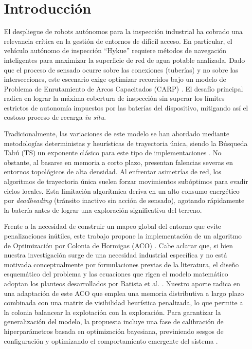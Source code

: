 \documentclass[conference]{IEEEtran}
\begin{document}
\section{Introducción}
El despliegue de robots autónomos para la inspección industrial ha cobrado una relevancia crítica en la gestión de entornos de difícil acceso. En particular, el vehículo autónomo de inspección ``Hykue'' requiere métodos de navegación inteligentes para maximizar la superficie de red de agua potable analizada. Dado que el proceso de sensado ocurre sobre las conexiones (tuberías) y no sobre las intersecciones, este escenario exige optimizar recorridos bajo un modelo de Problema de Enrutamiento de Arcos Capacitados (CARP) \cite{b2}. El desafío principal radica en lograr la máxima cobertura de inspección sin superar los límites estrictos de autonomía impuestos por las baterías del dispositivo, mitigando así el costoso proceso de recarga \textit{in situ}.

Tradicionalmente, las variaciones de este modelo se han abordado mediante metodologías deterministas y heurísticas de trayectoria única, siendo la Búsqueda Tabú (TS) un exponente clásico para este tipo de implementaciones \cite{b3}. No obstante, al basarse en memoria a corto plazo, presentan falencias severas en entornos topológicos de alta densidad. Al enfrentar asimetrías de red, los algoritmos de trayectoria única suelen forzar movimientos subóptimos para evadir ciclos locales. Esta limitación algorítmica deriva en un alto consumo energético por \textit{deadheading} (tránsito inactivo sin acción de sensado), agotando rápidamente la batería antes de lograr una exploración significativa del terreno.

Frente a la necesidad de construir un mapeo global del entorno que evite penalizaciones inútiles, este trabajo propone la implementación de un algoritmo de Optimización por Colonia de Hormigas (ACO) \cite{b4}. Cabe aclarar que, si bien nuestra investigación surge de una necesidad industrial específica y no está motivada conceptualmente por formulaciones previas de la literatura, el diseño esquemático del problema y las ecuaciones que rigen el modelo matemático adoptan los planteos desarrollados por Batista et al. \cite{b1}. Nuestro aporte radica en una adaptación de este ACO que emplea una memoria distributiva a largo plazo combinada con una matriz de visibilidad heurística penalizada, lo que permite a la colonia balancear la explotación con la exploración. Para garantizar la generalización del modelo, la propuesta incluye una fase de calibración de hiperparámetros basada en optimización bayesiana, previniendo sesgos de configuración y optimizando el comportamiento emergente del sistema \cite{b6}.
\end{document}
